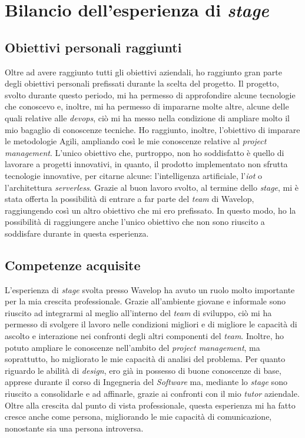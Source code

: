 \section{Bilancio dell'esperienza di \emph{stage}}

\subsection{Obiettivi personali raggiunti}
Oltre ad avere raggiunto tutti gli obiettivi aziendali, ho raggiunto gran parte degli obiettivi personali prefissati durante la scelta del progetto.
Il progetto, svolto durante questo periodo, mi ha permesso di approfondire alcune tecnologie che conoscevo e, inoltre, mi ha permesso di impararne molte altre, alcune delle quali relative alle \emph{devops}, ciò mi ha messo nella condizione di ampliare molto il mio bagaglio di conoscenze tecniche. 
Ho raggiunto, inoltre, l'obiettivo di imparare le metodologie Agili, ampliando così le mie conoscenze relative al \emph{project management}.
L'unico obiettivo che, purtroppo, non ho soddisfatto è quello di lavorare a progetti innovativi, in quanto, il prodotto implementato non sfrutta tecnologie innovative, per citarne alcune: l'intelligenza artificiale, l'\emph{\acrlong{iot}} o l'architettura \emph{serverless}.
Grazie al buon lavoro svolto, al termine dello \emph{stage}, mi è stata offerta la possibilità di entrare a far parte del \emph{team} di Wavelop, raggiungendo così un altro obiettivo che mi ero prefissato.
In questo modo, ho la possibilità di raggiungere anche l'unico obiettivo che non sono riuscito a soddisfare durante in questa esperienza.

\subsection{Competenze acquisite}
L'esperienza di \emph{stage} svolta presso Wavelop ha avuto un ruolo molto importante per la mia crescita professionale.
Grazie all'ambiente giovane e informale sono riuscito ad integrarmi al meglio all'interno del \emph{team} di sviluppo, ciò mi ha permesso di svolgere il lavoro nelle condizioni migliori e di migliore le capacità di ascolto e interazione nei confronti degli altri componenti del \emph{team}.
Inoltre, ho potuto ampliare le conoscenze nell'ambito del \emph{project management}, ma soprattutto, ho migliorato le mie capacità di analisi del problema.
Per quanto riguardo le abilità di \emph{design}, ero già in possesso di buone conoscenze di base, apprese durante il corso di Ingegneria del \emph{Software} ma, mediante lo \emph{stage} sono riuscito a consolidarle e ad affinarle, grazie ai confronti con il mio \emph{tutor} aziendale.
Oltre alla crescita dal punto di vista professionale, questa esperienza mi ha fatto cresce anche come persona, migliorando le mie capacità di comunicazione, nonostante sia una persona introversa.

